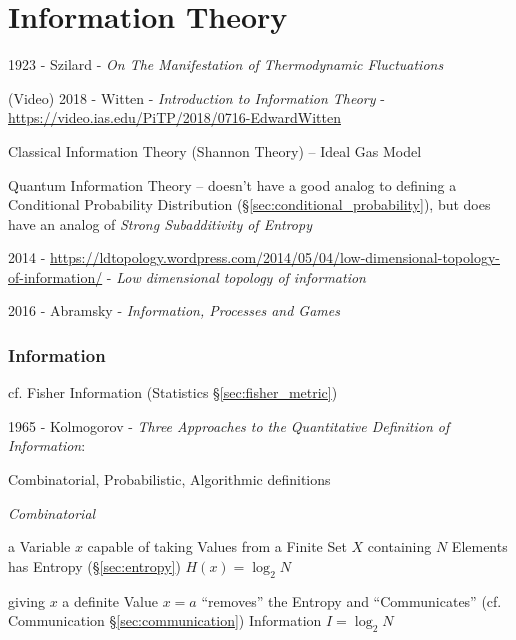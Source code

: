 \part{Information Theory}\label{part:information_theory}

1923 - Szilard - \emph{On The Manifestation of Thermodynamic Fluctuations}

\cite{shannon48}

(Video) 2018 - Witten - \emph{Introduction to Information Theory} -
\url{https://video.ias.edu/PiTP/2018/0716-EdwardWitten}

Classical Information Theory (Shannon Theory) -- Ideal Gas Model

Quantum Information Theory -- doesn't have a good analog to defining a
Conditional Probability Distribution (\S\ref{sec:conditional_probability}), but
does have an analog of \emph{Strong Subadditivity of Entropy}

2014 -
\url{https://ldtopology.wordpress.com/2014/05/04/low-dimensional-topology-of-information/} -
\emph{Low dimensional topology of information}

2016 - Abramsky - \emph{Information, Processes and Games}



\section{Information}\label{sec:information}

\fist cf. Fisher Information (Statistics \S\ref{sec:fisher_metric})

1965 - Kolmogorov -
\emph{Three Approaches to the Quantitative Definition of Information}:

Combinatorial, Probabilistic, Algorithmic definitions

\emph{Combinatorial}

a Variable $x$ capable of taking Values from a Finite Set $X$ containing $N$
Elements has Entropy (\S\ref{sec:entropy}) $H(x) = \log_2 N$

giving $x$ a definite Value $x = a$ ``removes'' the Entropy and ``Communicates''
(cf. Communication \S\ref{sec:communication}) Information $I = \log_2 N$

